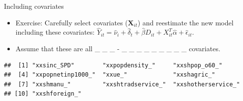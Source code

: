 \documentclass[ignorenonframetext,]{beamer}
\newenvironment{Shaded}{\begin{snugshade}}{\end{snugshade}}
\newcommand{\KeywordTok}[1]{\textcolor[rgb]{0.13,0.29,0.53}{\textbf{#1}}}
\newcommand{\StringTok}[1]{\textcolor[rgb]{0.31,0.60,0.02}{#1}}
\newcommand{\OperatorTok}[1]{\textcolor[rgb]{0.81,0.36,0.00}{\textbf{#1}}}
\newcommand{\NormalTok}[1]{#1}
\begin{document}
\begin{frame}[fragile]{Including covariates}

\begin{itemize}[<+->]
\item
  Exercise: Carefully select covariates (\(\textbf{X}_{it}\)) and
  reestimate the new model including these covariates:
  \(\hat{Y}_{it} = \hat{\nu}_{i} + \hat{\delta}_{t} + \hat{\beta}D_{it} + X_{it}^{T}\hat{\alpha} + \hat{\epsilon}_{it}\).
\item
  Assume that these are all \_ \_ \_ - \_ \_ \_ \_ \_ \_ \_ \_ \_
  covariates.
\end{itemize}

\begin{Shaded}
\end{Shaded}

\begin{verbatim}
##  [1] "xxsinc_SPD"        "xxpopdensity_"     "xxshpop_o60_"     
##  [4] "xxpopnetinp1000_"  "xxue_"             "xxshagric_"       
##  [7] "xxshmanu_"         "xxshtradservice_"  "xxshotherservice_"
## [10] "xxshforeign_"
\end{verbatim}

\end{frame}
\end{document}
